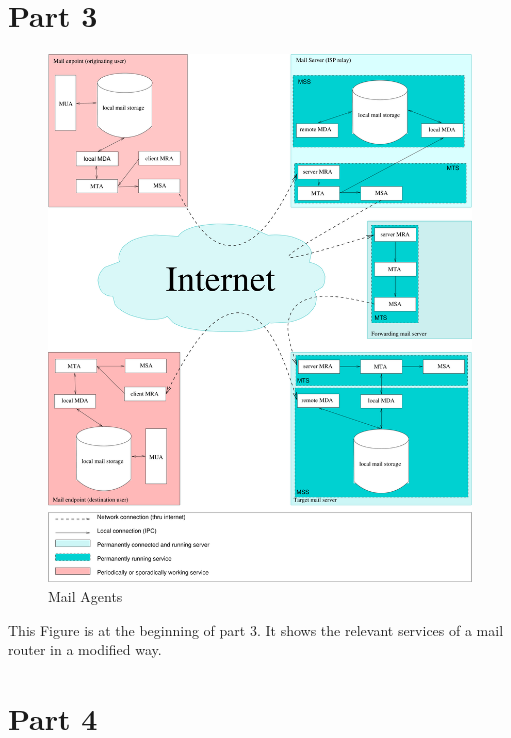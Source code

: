 \documentclass{extarticle}
\begin{document}
	\section{Part 3}
	\begin{figure}[ht!]
		\centering\includegraphics[width=\columnwidth]{inc/MailAgents1.pdf}
		\caption{Mail Agents}
		\label{fig:MailAgents}
	\end{figure}
	This Figure is at the beginning of part 3. It shows the relevant services of a mail router in a modified way.
	
	\section{Part 4}
	
\end{document}
